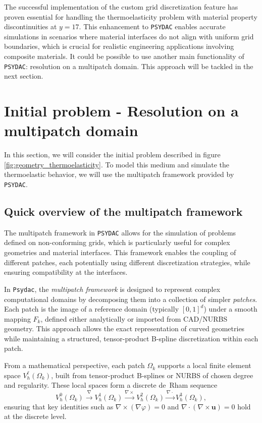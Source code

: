 \documentclass[a4paper,12pt,twoside]{report}
\begin{document}
The successful implementation of the custom grid discretization feature has proven essential for handling the thermoelasticity problem with material property discontinuities at $y = 17$. This enhancement to \texttt{PSYDAC} enables accurate simulations in scenarios where material interfaces do not align with uniform grid boundaries, which is crucial for realistic engineering applications involving composite materials. It could be possible to use another main functionality of \texttt{PSYDAC}: resolution on a multipatch domain. This approach will be tackled in the next section. 

\section{Initial problem - Resolution on a multipatch domain}

In this section, we will consider the initial problem described in figure \ref{fig:geometry_thermoelasticity}. To model this medium and simulate the thermoelastic behavior, we will use the multipatch framework provided by \texttt{PSYDAC}.

\subsection{Quick overview of the multipatch framework}

The multipatch framework in \texttt{PSYDAC} allows for the simulation of problems defined on non-conforming grids, which is particularly useful for complex geometries and material interfaces. This framework enables the coupling of different patches, each potentially using different discretization strategies, while ensuring compatibility at the interfaces. 

In \texttt{Psydac}, the \emph{multipatch framework} is designed to represent complex computational domains by decomposing them into a collection of simpler \emph{patches}. Each patch is the image of a reference domain (typically $[0,1]^d$) under a smooth mapping $F_k$, defined either analytically or imported from CAD/NURBS geometry. This approach allows the exact representation of curved geometries while maintaining a structured, tensor-product B-spline discretization within each patch.

From a mathematical perspective, each patch $\Omega_k$ supports a local finite element space $V_h^\ell(\Omega_k)$, built from tensor-product B-splines or NURBS of chosen degree and regularity. These local spaces form a discrete de~Rham sequence
\[
V_h^0(\Omega_k) \xrightarrow{\nabla} V_h^1(\Omega_k) \xrightarrow{\nabla \times} V_h^2(\Omega_k) \xrightarrow{\nabla \cdot} V_h^3(\Omega_k),
\]
ensuring that key identities such as $\nabla \times (\nabla \varphi) = 0$ and $\nabla \cdot (\nabla \times \mathbf{u}) = 0$ hold at the discrete level.
\end{document}
